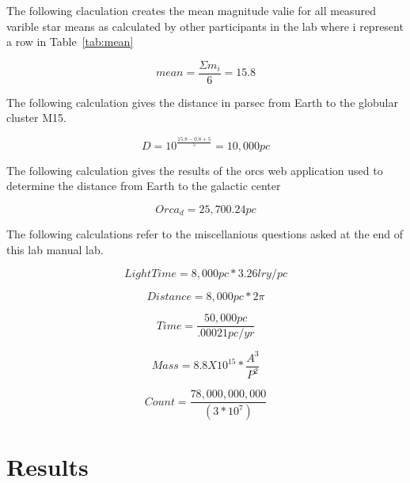 \documentclass{article}
\begin{document}
The following claculation creates the mean magnitude valie for all measured varible star
means as calculated by other participants in the lab where i represent a row in
Table~\ref{tab:mean}

\begin{equation}
\label{calc:mm}
mean = \frac{\Sigma m_{i}}{6} = 15.8
\end{equation}

The following calculation gives the distance in parsec from Earth to the globular cluster
M15.

\begin{equation}
\label{calc:d1}
D = 10^{\frac{15.8 - 0.8 + 5}{5}} = 10,000 pc
\end{equation}

The following calculation gives the results of the orcs web application used to determine
the distance from Earth to the galactic center

\begin{equation}
\label{calc:d2}
Orca_{d} = 25,700.24 pc
\end{equation}

The following calculations refer to the miscellanious questions asked at the end
of this lab manual lab.

\begin{equation}
\label{calc:m1}
Light Time = 8,000 pc * 3.26 lry/pc
\end{equation}

\begin{equation}
\label{calc:m2}
Distance = 8,000pc * 2\pi
\end{equation}

\begin{equation}
\label{calc:m3}
Time = \frac{50,000pc}{.00021pc/yr}
\end{equation}

\begin{equation}
\label{calc:m4}
Mass = 8.8X10^{15}*\frac{A^3}{P^2}
\end{equation}

\begin{equation}
\label{calc:m5}
Count = \frac{78,000,000,000}{(3*10^7)}
\end{equation}


\section{Results}
\end{document}
